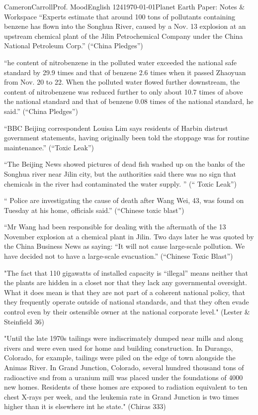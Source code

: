 \documentclass[12pt,letterpaper]{article}
\begin{document}
\begin{mla}{Cameron}{Carroll}{Prof. Mood}{English 124}{\today}{Planet Earth Paper: Notes \& Workspace}
``Experts estimate that around 100 tons of pollutants containing benzene has flown into the Songhua River, caused by a Nov. 13 explosion at an upstream chemical plant of the Jilin Petrochemical Company under the China National Petroleum Corp.'' (``China Pledges'')

``he content of nitrobenzene in the polluted water exceeded the national safe standard by 29.9 times and that of benzene 2.6 times when it passed Zhaoyuan from Nov. 20 to 22. When the polluted water flowed further downstream, the content of nitrobenzene was reduced further to only about 10.7 times of above the national standard and that of benzene 0.08 times of the national standard, he said.'' (``China Pledges'')

``BBC Beijing correspondent Louisa Lim says residents of Harbin distrust government statements, having originally been told the stoppage was for routine maintenance.'' (``Toxic Leak'')

``The Beijing News showed pictures of dead fish washed up on the banks of the Songhua river near Jilin city, but the authorities said there was no sign that chemicals in the river had contaminated the water supply. '' (`` Toxic Leak'')

`` Police are investigating the cause of death after Wang Wei, 43, was found on Tuesday at his home, officials said.'' (``Chinese toxic blast'')

``Mr Wang had been responsible for dealing with the aftermath of the 13 November explosion at a chemical plant in Jilin.
Two days later he was quoted by the China Business News as saying: ``It will not cause large-scale pollution. We have decided not to have a large-scale evacuation.'' (``Chinese Toxic Blast'')





"The fact that 110 gigawatts of installed capacity is ``illegal'' means neither that the plants are hidden in a closet nor that they lack any governmental oversight. What it does mean is that they are not part of a coherent national policy, that they frequently operate outside of national standards, and that they often evade control even by their ostensible owner at the national corporate level." (Lester \& Steinfield 36)

"Until the late 1970s tailings were indiscrimately dumped near mills and along rivers and were even used for home and building construction. In Durango, Colorado, for example, tailings were piled on the edge of town alongside the Animas River. In Grand Junction, Colorado, several hundred thousand tons of radioactive snd from a uranium mill was placed under the foundations of 4000 new homes. Residents of these homes are exposed to radiation equivalent to ten chest X-rays per week, and the leukemia rate in Grand Junction is two times higher than it is elsewhere int he state." (Chiras 333)



\end{mla}
\end{document}
